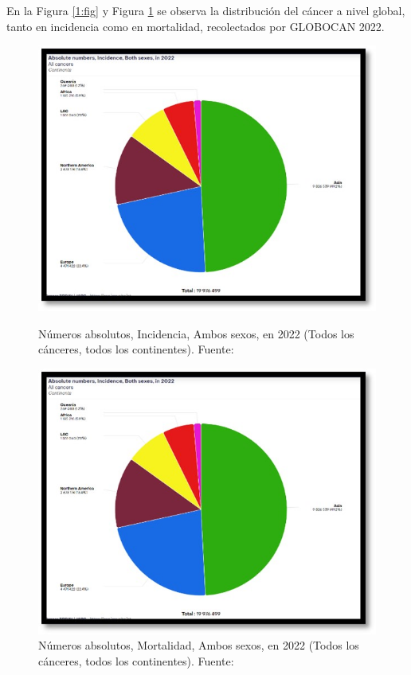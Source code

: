 En la Figura \ref{1:fig} y Figura \ref{2:fig} se observa la distribución del cáncer a nivel global, tanto en incidencia como en mortalidad, recolectados por GLOBOCAN 2022.%

\begin{figure}[ht]
    \centering
    \begin{minipage}[b]{0.48\textwidth}
        \centering
        \includegraphics[width=\textwidth]{1/figures/Incidencias.jpg}
        \caption{Números absolutos, Incidencia, Ambos sexos, en 2022 (Todos los cánceres, todos los continentes). Fuente:\cite{iarc}}
        \label{1:fig}
    \end{minipage}
    \hfill
    \begin{minipage}[b]{0.48\textwidth}
        \centering
        \includegraphics[width=\textwidth]{1/figures/Incidencias.jpg}
        \caption{Números absolutos, Mortalidad, Ambos sexos, en 2022 (Todos los cánceres, todos los continentes). Fuente:\cite{iarc}}
        \label{2:fig}
    \end{minipage}
\end{figure}

